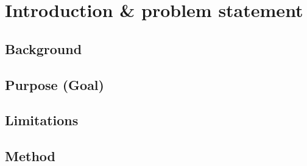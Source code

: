 \section{Introduction \& problem statement}

\subsection{Background}

\subsection{Purpose (Goal)}

\subsection{Limitations}

\subsection{Method}


